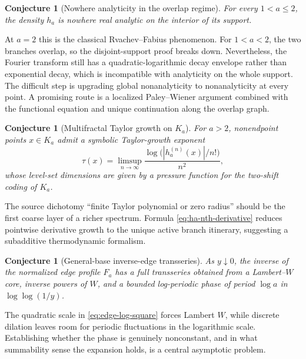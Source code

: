 \documentclass[11pt]{article}
\newtheorem{conjecture}[theorem]{Conjecture}
\theoremstyle{definition}
\theoremstyle{remark}
\begin{document}
\begin{conjecture}[Nowhere analyticity in the overlap regime]
\label{conj:overlap-analyticity}
For every \(1<a\le2\), the density \(h_a\) is nowhere real analytic on the interior of its support.
\end{conjecture}

At \(a=2\) this is the classical Rvachev--Fabius phenomenon.  For \(1<a<2\), the two branches overlap, so the disjoint-support proof breaks down.  Nevertheless, the Fourier transform still has a quadratic-logarithmic decay envelope rather than exponential decay, which is incompatible with analyticity on the whole support.  The difficult step is upgrading global nonanalyticity to nonanalyticity at every point.  A promising route is a localized Paley--Wiener argument combined with the functional equation and unique continuation along the overlap graph.

\begin{conjecture}[Multifractal Taylor growth on \(K_a\)]
\label{conj:taylor-multifractal}
For \(a>2\), nonendpoint points \(x\in K_a\) admit a symbolic Taylor-growth exponent
\begin{equation}
  \tau(x)=\limsup_{n\to\infty}
  \frac{\log\bigl(|h_a^{(n)}(x)|/n!\bigr)}{n^2},
  \label{eq:tau-x}
\end{equation}
whose level-set dimensions are given by a pressure function for the two-shift coding of \(K_a\).
\end{conjecture}

The source dichotomy ``finite Taylor polynomial or zero radius'' should be the first coarse layer of a richer spectrum.  Formula \eqref{eq:ha-nth-derivative} reduces pointwise derivative growth to the unique active branch itinerary, suggesting a subadditive thermodynamic formalism.

\begin{conjecture}[General-base inverse-edge transseries]
\label{conj:general-base-lambert}
As \(y\downarrow0\), the inverse of the normalized edge profile \(F_a\) has a full transseries obtained from a Lambert--\(W\) core, inverse powers of \(W\), and a bounded log-periodic phase of period \(\log a\) in \(\log\log(1/y)\).
\end{conjecture}

The quadratic scale in \eqref{eq:edge-log-square} forces Lambert \(W\), while discrete dilation leaves room for periodic fluctuations in the logarithmic scale.  Establishing whether the phase is genuinely nonconstant, and in what summability sense the expansion holds, is a central asymptotic problem.
\end{document}
